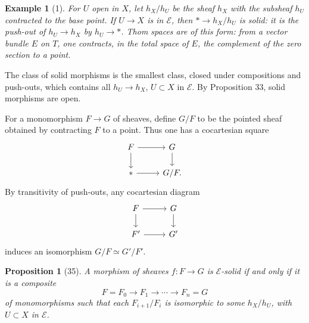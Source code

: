\documentclass[11pt]{article}
\newcommand{\pt}{*}
\theoremstyle{deligne}
\newtheorem*{proposition*}{Proposition}
\newtheorem*{example*}{Example}
\begin{document}
\begin{example*}[1]
For \(U\) open in \(X\), let \(h_X/h_U\) be the sheaf \(h_X\) with the subsheaf \(h_U\) contracted to the base point. If \(U\to X\) is in \(\mathcal E\), then \(\pt\to h_X/h_U\) is solid: it is the push-out of \(h_U\to h_X\) by \(h_U\to\pt\). Thom spaces are of this form: from a vector bundle \(E\) on \(T\), one contracts, in the total space of \(E\), the complement of the zero section to a point.
\end{example*}

The class of solid morphisms is the smallest class, closed under compositions and push-outs, which contains all \(h_U\to h_X\), \(U\subset X\) in \(\mathcal E\). By Proposition 33, solid morphisms are open.

For a monomorphism \(F\to G\) of sheaves, define \(G/F\) to be the pointed sheaf obtained by contracting \(F\) to a point. Thus one has a cocartesian square
\[
\begin{tikzcd}[column sep=2.6em,row sep=1.6em]
F \arrow[r] \arrow[d] & G \arrow[d]\\
\pt \arrow[r] & G/F .
\end{tikzcd}
\]
By transitivity of push-outs, any cocartesian diagram
\[
\begin{tikzcd}[column sep=2.6em,row sep=1.6em]
F \arrow[r] \arrow[d] & G \arrow[d]\\
F' \arrow[r] & G'
\end{tikzcd}
\]
induces an isomorphism \(G/F\simeq G'/F'\).

\begin{proposition*}[35]
A morphism of sheaves \(f:F\to G\) is \(\mathcal E\)-solid if and only if it is a composite
\[
F=F_0\longrightarrow F_1\longrightarrow \cdots\longrightarrow F_n=G
\]
of monomorphisms such that each \(F_{i+1}/F_i\) is isomorphic to some \(h_X/h_U\), with \(U\subset X\) in \(\mathcal E\).
\end{proposition*}
\end{document}
